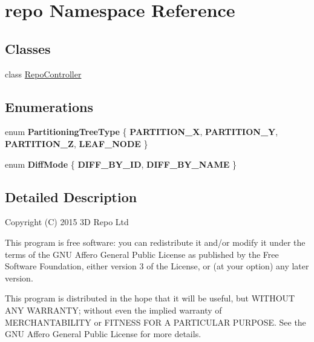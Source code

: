 \hypertarget{namespacerepo}{}\section{repo Namespace Reference}
\label{namespacerepo}
\subsection*{Classes}
\begin{DoxyCompactItemize}
\item 
class \hyperlink{classrepo_1_1_repo_controller}{Repo\+Controller}
\end{DoxyCompactItemize}
\subsection*{Enumerations}
\begin{DoxyCompactItemize}
\item 
\hypertarget{namespacerepo_ae9127c42b4547b18c19fb8664898d2e9}{}enum {\bfseries Partitioning\+Tree\+Type} \{ {\bfseries P\+A\+R\+T\+I\+T\+I\+O\+N\+\_\+\+X}, 
{\bfseries P\+A\+R\+T\+I\+T\+I\+O\+N\+\_\+\+Y}, 
{\bfseries P\+A\+R\+T\+I\+T\+I\+O\+N\+\_\+\+Z}, 
{\bfseries L\+E\+A\+F\+\_\+\+N\+O\+D\+E}
 \}\label{namespacerepo_ae9127c42b4547b18c19fb8664898d2e9}

\item 
\hypertarget{namespacerepo_a4bfc1d6c4d653e019ca4b1f29d100782}{}enum {\bfseries Diff\+Mode} \{ {\bfseries D\+I\+F\+F\+\_\+\+B\+Y\+\_\+\+I\+D}, 
{\bfseries D\+I\+F\+F\+\_\+\+B\+Y\+\_\+\+N\+A\+M\+E}
 \}\label{namespacerepo_a4bfc1d6c4d653e019ca4b1f29d100782}

\end{DoxyCompactItemize}


\subsection{Detailed Description}
Copyright (C) 2015 3\+D Repo Ltd

This program is free software\+: you can redistribute it and/or modify it under the terms of the G\+N\+U Affero General Public License as published by the Free Software Foundation, either version 3 of the License, or (at your option) any later version.

This program is distributed in the hope that it will be useful, but W\+I\+T\+H\+O\+U\+T A\+N\+Y W\+A\+R\+R\+A\+N\+T\+Y; without even the implied warranty of M\+E\+R\+C\+H\+A\+N\+T\+A\+B\+I\+L\+I\+T\+Y or F\+I\+T\+N\+E\+S\+S F\+O\+R A P\+A\+R\+T\+I\+C\+U\+L\+A\+R P\+U\+R\+P\+O\+S\+E. See the G\+N\+U Affero General Public License for more details.

